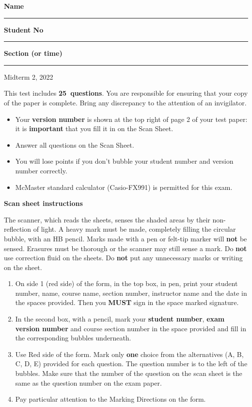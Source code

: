\documentclass[12pt]{article}
\def\midterm{2}
\def\year{2022}
\def\questions{25}
\begin{document}
\noindent \textbf{Name} \rule{5cm}{1pt} \hfill \textbf{Student No} \rule{5cm}{1pt}

\noindent
\textbf{Section (or time)} \rule{5cm}{1pt}

\bigskip

{ \par}
{\centering Midterm \midterm, \year\par}

\parindent0pt

\vfill

This test includes {\bf \questions\ questions}. You are responsible for ensuring that your copy of the paper is complete. Bring any discrepancy to the attention of an invigilator. 

\vfill

\begin{itemize}
\item Your \textbf{version number} is shown at the top right of page 2 of your test paper: it is \textbf{important} that you fill it in on the Scan Sheet.
\item Answer all questions on the Scan Sheet. 
\item You will lose points if you don't bubble your student number and version number correctly.
\item McMaster standard calculator (Casio-FX991) is permitted for this exam.
\end{itemize}

\vfill

\textbf{Scan sheet instructions}

\small{
The scanner, which reads the sheets, senses the shaded areas by their non-reflection of light. A heavy mark must be made, completely filling the circular bubble, with an HB pencil. Marks made with a pen or felt-tip marker will \textbf{not} be sensed. Erasures must be thorough or the scanner may still sense a mark. Do \textbf{not} use correction fluid on the sheets. Do \textbf{not} put any unnecessary marks or writing on the sheet.

\begin{enumerate}
\item On side 1 (red side) of the form, in the top box, in pen, print your student number, name, course name, section number, instructor name and the date in the spaces provided. Then you {\bf MUST} sign in the space marked signature.

\item In the second box, with a pencil, mark your {\bf student number}, {\bf exam version number} and course section number in the space provided and fill in the corresponding bubbles underneath.

\item Use Red side of the form. Mark only {\bf one} choice from the alternatives (A, B, C, D, E) provided for each question. The question number is to the left of the bubbles. Make sure that the number of the question on the scan sheet is the same as the question number on the exam paper.
\item  Pay particular attention to the Marking Directions on the form.
\end{enumerate}
}

\vfill
{ \par}
\end{document}
